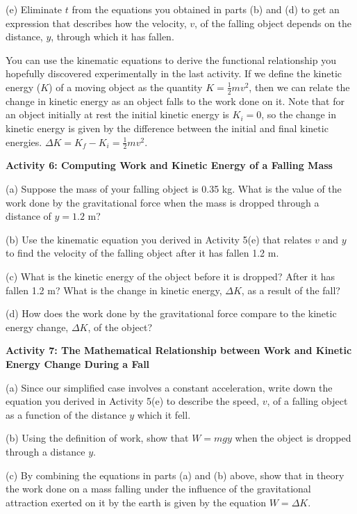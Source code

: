 (e) Eliminate $t$ from the equations you obtained in parts (b) and (d) to get
an expression that describes how the velocity, $v$, 
of the falling object depends
on the distance, $y$, through which it has fallen. 
\answerspace{20mm}

You can use the kinematic equations to derive the functional relationship you
hopefully discovered experimentally in the last activity. If we define the kinetic
energy ($K$) of a moving object as the quantity $K = \frac{1}{2}mv^{2}$, then we
can relate the change in kinetic energy as an object falls to the work done
on it. Note that for an object initially at rest the initial kinetic energy
is \(K _{i}=0\), so the change in kinetic energy is given by the difference
between the initial and final kinetic energies. \( \Delta  K = K _{f}
- K_{i}  = \frac{1}{2}mv^{2} \).

\bigskip
\textbf{Activity 6: Computing Work and Kinetic Energy of a Falling Mass} 

(a) Suppose the mass of your falling object is 0.35 kg. What is the value of
the work done by the gravitational force when the mass is dropped through a
distance of $y = 1.2$ m? 
\answerspace{20mm}

(b) Use the kinematic equation you derived in Activity 5(e) that relates $v$ and
$y$ to find the velocity of the falling object after it has fallen 1.2 m.
\answerspace{20mm}

(c) What is the kinetic energy of the object before it is dropped? After it
has fallen 1.2 m? What is the change in kinetic energy, \( \Delta  K\), as
a result of the fall?
\answerspace{20mm}

(d) How does the work done by the gravitational force compare to the kinetic
energy change, \( \Delta  K\), of the object?
\answerspace{20mm}

\pagebreak[2]

\textbf{Activity 7: The Mathematical Relationship between Work and Kinetic Energy
Change During a Fall }

(a) Since our simplified case involves a constant acceleration, write down the
equation you derived in Activity 5(e) to describe the speed, $v$, of a falling
object as a function of the distance $y$ which it fell.
\vspace{10mm}

(b) Using the definition of work, show that $W = mgy$ when the object is dropped
through a distance $y$.
\vspace{20mm}

(c) By combining the equations in parts (a) and (b) above, show that in theory
the work done on a mass falling under the influence of the gravitational attraction
exerted on it by the earth is given by the equation \(W = \Delta  K\).
\vspace{20mm}

